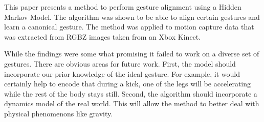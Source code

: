 \documentclass{article}
\begin{document}
This paper presents a method to perform gesture alignment using a Hidden
Markov Model. The algorithm was shown to be able to align certain gestures and
learn a canonical gesture. The method was applied to motion capture data that
was extracted from RGBZ images taken from an Xbox Kinect.

While the findings were some what promising it failed to work on a diverse set
of gestures. There are obvious areas for future work. First, the model should
incorporate our prior knowledge of the ideal gesture. For example, it would
certainly help to encode that during a kick, one of the legs will be
accelerating while the rest of the body stays still. Second, the algorithm
should incorporate a dynamics model of the real world. This will allow the
method to better deal with physical phenomenons like gravity.







\end{document}
